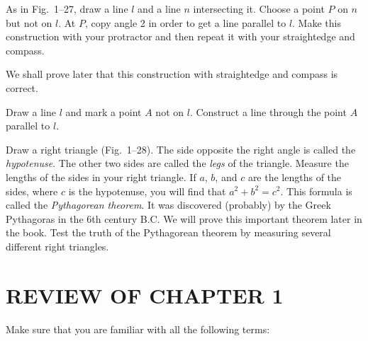 \documentclass[11pt]{book}
\begin{document}
\begin{exercisecols}
\begin{exlist}
      As in Fig.~1--27, draw a line $l$ and a line $n$ intersecting it. Choose a
      point $P$ on $n$ but not on $l$. At $P$, copy angle 2 in order to get a line
      parallel to $l$. Make this construction with your protractor and then repeat
      it with your straightedge and compass.

      We shall prove later that this construction with straightedge and compass is
      correct.
\exfig{\FIGITWENTYSIX}
\exfig{\FIGITWENTYSEVEN}
\item Draw a line $l$ and mark a point $A$ not on $l$. Construct a line through
      the point $A$ parallel to $l$.
\item Draw a right triangle (Fig.~1--28). The side opposite the right angle is
      called the \emph{hypotenuse}. The other two sides are called the \emph{legs}
      of the triangle. Measure the lengths of the sides in your right triangle. If
      $a$, $b$, and $c$ are the lengths of the sides, where $c$ is the hypotenuse,
      you will find that $a^2 + b^2 = c^2$. This formula is called the
      \emph{Pythagorean theorem}. It was discovered (probably) by the Greek
      Pythagoras in the 6th century B.C. We will prove this important theorem
      later in the book. Test the truth of the Pythagorean theorem by measuring
      several different right triangles.
\exfig{\FIGITWENTYEIGHT}
\end{exlist}
\end{exercisecols}

\section*{REVIEW OF CHAPTER 1}

\begin{exlist}
\item Make sure that you are familiar with all the following terms:
\end{exlist}
\end{document}
